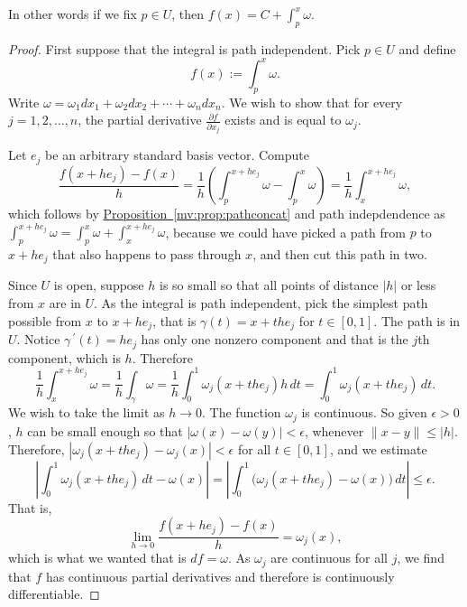\documentclass[12pt]{book}
\newcommand{\snorm}[1]{\lVert {#1} \rVert}
\newcommand{\abs}[1]{\left\lvert {#1} \right\rvert}
\theoremstyle{plain}
\theoremstyle{remark}
\theoremstyle{definition}
\theoremstyle{exercise}
\theoremstyle{example}
\newcommand{\propref}[1]{\hyperref[#1]{Proposition~\ref*{#1}}}
\begin{document}
In other words if we fix $p \in U$, then $f(x) = C + \int_{p}^x \omega$.

\begin{proof}
First suppose that the integral is path independent.  Pick $p \in U$
and define
\begin{equation*}
f(x) := \int_{p}^x \omega .
\end{equation*}
Write $\omega = \omega_1 dx_1 + \omega_2 dx_2 + \cdots + \omega_n dx_n$.
We wish to show that for every $j = 1,2,\ldots,n$, the
partial derivative $\frac{\partial f}{\partial x_j}$ exists
and is equal to $\omega_j$.

Let $e_j$ be an arbitrary standard basis vector.  Compute
\begin{equation*}
\frac{f(x+h e_j) - f(x)}{h} =
\frac{1}{h} \left( \int_{p}^{x+he_j} \omega - \int_{p}^x \omega \right)
=
\frac{1}{h} \int_{x}^{x+he_j} \omega ,
\end{equation*}
which follows by \propref{mv:prop:pathconcat} and path indepdendence as 
$\int_{p}^{x+he_j} \omega =
\int_{p}^{x} \omega +
\int_{x}^{x+he_j} \omega$, because we could have picked a path from $p$ to
$x+he_j$ that also happens to pass through $x$, and then cut this path in
two.


Since $U$ is open, suppose $h$ is so small so that all points of distance
$\abs{h}$ or
less from $x$ are in $U$.
As the integral is path independent,
pick the simplest path possible from $x$ to $x+he_j$, that is
$\gamma(t) = x+t he_j$ for $t \in [0,1]$.  The path is in $U$.
Notice $\gamma^{\:\prime}(t) = h e_j$
has only one nonzero component and that is the $j$th component, which is
$h$.  Therefore
\begin{equation*}
\frac{1}{h} \int_{x}^{x+he_j} \omega 
=
\frac{1}{h} \int_{\gamma} \omega 
=
\frac{1}{h} \int_0^1 \omega_j(x+the_j) h \, dt 
=
\int_0^1 \omega_j(x+the_j) \, dt  .
\end{equation*}
We wish to take the limit as $h \to 0$.  The function $\omega_j$ is
continuous.  So given $\epsilon > 0$, $h$ can be small enough so that
$\abs{\omega(x)-\omega(y)} < \epsilon$, whenever $\snorm{x-y} \leq \abs{h}$.
Therefore,
$\abs{\omega_j(x+the_j)-\omega_j(x)} < \epsilon$ for all $t \in [0,1]$,
and we estimate
\begin{equation*}
\abs{\int_0^1 \omega_j(x+the_j) \, dt  - \omega(x)}
=
\abs{\int_0^1 \bigl( \omega_j(x+the_j) - \omega(x) \bigr) \, dt}
\leq
\epsilon .
\end{equation*}
That is,
\begin{equation*}
\lim_{h\to 0}\frac{f(x+h e_j) - f(x)}{h} = \omega_j(x) ,
\end{equation*}
which is what we wanted that is $df = \omega$.  As $\omega_j$ are
continuous for all $j$, we find that $f$ has continuous partial derivatives and
therefore is continuously differentiable.


\end{proof}
\end{document}
